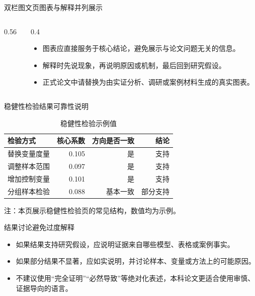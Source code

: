 \documentclass[aspectratio=169,11pt]{beamer}
\begin{document}
\begin{frame}{双栏图文页}{图表与解释并列展示}
  \begin{columns}[T,onlytextwidth]
    \begin{column}{0.56\textwidth}
      \centering
    \end{column}
    \begin{column}{0.4\textwidth}
      \begin{itemize}
        \item 图表应直接服务于核心结论，避免展示与论文问题无关的信息。
        \item 解释时先说现象，再说明原因或机制，最后回到研究假设。
        \item 正式论文中请替换为由实证分析、调研或案例材料生成的真实图表。
      \end{itemize}
    \end{column}
  \end{columns}
\end{frame}

\begin{frame}{稳健性检验}{结果可靠性说明}
  \begin{table}
    \centering
    \caption{稳健性检验示例值}
    \begin{tabular}{lrrr}
      \toprule
      检验方式 & 核心系数 & 方向是否一致 & 结论 \\
      \midrule
      替换变量度量 & 0.105 & 是 & 支持 \\
      调整样本范围 & 0.097 & 是 & 支持 \\
      增加控制变量 & 0.101 & 是 & 支持 \\
      分组样本检验 & 0.088 & 基本一致 & 部分支持 \\
      \bottomrule
    \end{tabular}
  \end{table}
  \scriptsize 注：本页展示稳健性检验页的常见结构，数值均为示例。
\end{frame}

\begin{frame}{结果讨论}{避免过度解释}
  \begin{itemize}
    \item 如果结果支持研究假设，应说明证据来自哪些模型、表格或案例事实。
    \item 如果部分结果不显著，应如实说明，并讨论样本、变量或方法上的可能原因。
    \item 不建议使用“完全证明”“必然导致”等绝对化表述，本科论文更适合使用审慎、证据导向的语言。
  \end{itemize}
\end{frame}
\end{document}

